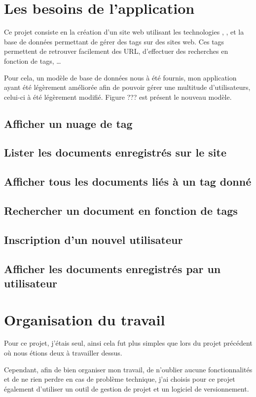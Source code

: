 \documentclass[12pt,a4paper,openany]{book}
\begin{document}
	\chapter{Les besoins de l'application}
	Ce projet consiste en la création d'un site web utilisant les technologies , ,  et la base de données 
	permettant de gérer des tags sur des sites web. Ces tags permettent de retrouver facilement des URL, d'effectuer des recherches
	en fonction de tags, \ldots

	Pour cela, un modèle de base de données nous à été fournis, mon application ayant été légèrement améliorée afin de pouvoir gérer
	une multitude d'utilisateurs, celui-ci à été légèrement modifié. Figure ??? est présent le nouveau modèle. %

	\section{Afficher un nuage de tag}
	\section{Lister les documents enregistrés sur le site}
	\section{Afficher tous les documents liés à un tag donné}
	\section{Rechercher un document en fonction de tags}
	\section{Inscription d'un nouvel utilisateur}
	\section{Afficher les documents enregistrés par un utilisateur}

	\chapter{Organisation du travail}
	Pour ce projet, j'étais seul, ainsi cela fut plus simples que lors du projet précédent où nous étions deux à travailler dessus. 

	Cependant, afin de bien organiser mon travail, de n'oublier aucune fonctionnalités et de ne rien perdre en cas de problème
	technique, j'ai choisis pour ce projet également d'utiliser un outil de gestion de projet et un logiciel de versionnement.
\end{document}
